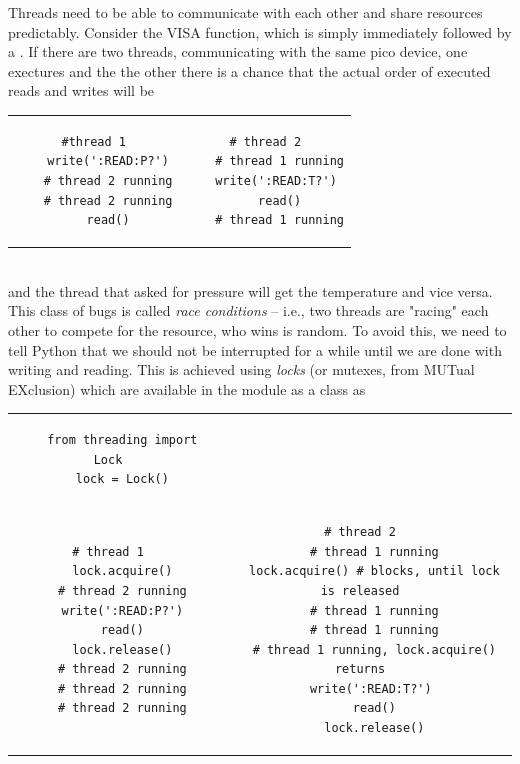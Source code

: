 Threads need to be able to communicate with each other and share resources predictably. Consider the VISA  function, which is simply  immediately followed by a . If there are two threads, communicating with the same pico device, one exectures  and the the other  there is a chance that the actual order of executed reads and writes will be
\begin{tabular}{cc}
\begin{lstlisting}[linewidth=0.49\linewidth]
    #thread 1
    write(':READ:P?')
    # thread 2 running
    # thread 2 running
    read()
\end{lstlisting}&
\begin{lstlisting}[linewidth=0.49\linewidth]
    # thread 2
    # thread 1 running
    write(':READ:T?') 
    read()
    # thread 1 running
\end{lstlisting}
\end{tabular}\\
and the thread that asked for pressure will get the temperature and vice versa. This class of bugs is called \emph{race conditions} -- i.e., two threads are "racing" each other to compete for the resource, who wins is random. To avoid this, we need to tell Python that we should not be interrupted for a while until we are done with writing and reading. This is achieved using \emph{locks} (or mutexes, from MUTual EXclusion) which are available in the  module as a  class as\\
\begin{tabular}{cc}
\begin{lstlisting}
    from threading import Lock
    lock = Lock()
\end{lstlisting}& \\
\begin{lstlisting}[linewidth=0.4\linewidth]
    # thread 1
    lock.acquire()
    # thread 2 running
    write(':READ:P?')
    read()
    lock.release()
    # thread 2 running
    # thread 2 running
    # thread 2 running
\end{lstlisting}&
\begin{lstlisting}[linewidth=0.6\linewidth]
    # thread 2
    # thread 1 running
    lock.acquire() # blocks, until lock is released
    # thread 1 running
    # thread 1 running
    # thread 1 running, lock.acquire() returns
    write(':READ:T?') 
    read()
    lock.release()
\end{lstlisting}
\end{tabular}

